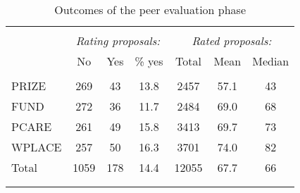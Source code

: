 \begin{table}
\centering
\caption{Outcomes of the peer evaluation phase}
\label{tab: ratings}
\begin{tabular}{@{}lcccccc}
  \\[-1.8ex]\hline \hline \\[-1.8ex]
 & \multicolumn{3}{c}{\emph{Rating proposals:}} &         \multicolumn{3}{c}{\emph{Rated proposals:}} \\
 \cmidrule(lr){2-4}\cmidrule(lr){5-7} & No & Yes & \% yes & Total & Mean & Median \\ 
  \hline \\[-1.86ex]
PRIZE & 269 & 43 & 13.8 & 2457 & 57.1 & 43 \\ 
  FUND & 272 & 36 & 11.7 & 2484 & 69.0 & 68 \\ 
  PCARE & 261 & 49 & 15.8 & 3413 & 69.7 & 73 \\ 
  WPLACE & 257 & 50 & 16.3 & 3701 & 74.0 & 82 \\ 
  [1.8ex] Total & 1059 & 178 & 14.4 & 12055 & 67.7 & 66 \\ 
   \\[-1.8ex]\hline \hline \\[-1.8ex]
\end{tabular}
\end{table}
